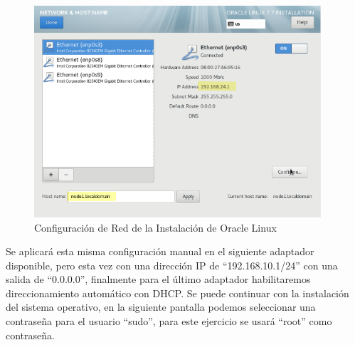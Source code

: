 \documentclass{article}
\begin{document}
\begin{figure}[H]
	\begin{center}
		\includegraphics[width=0.95\textwidth]{vm_networking.png}
	\end{center}
	\caption{Configuración de Red de la Instalación de Oracle Linux}
\end{figure}

Se aplicará esta misma configuración manual en el siguiente adaptador disponible, pero esta vez con una dirección IP de ``192.168.10.1/24'' con una salida de ``0.0.0.0'', finalmente para el último adaptador habilitaremos direccionamiento automático con DHCP. Se puede continuar con la instalación del sistema operativo, en la siguiente pantalla podemos seleccionar una contraseña para el usuario ``sudo'', para este ejercicio se usará ``root'' como contraseña.
\end{document}
